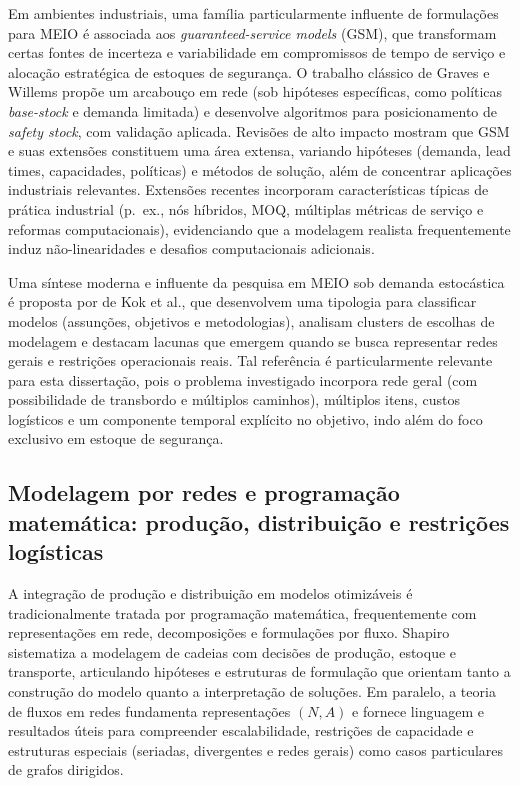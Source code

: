 Em ambientes industriais, uma família particularmente influente de formulações para MEIO é associada aos \emph{guaranteed-service models} (GSM), que transformam certas fontes de incerteza e variabilidade em compromissos de tempo de serviço e alocação estratégica de estoques de segurança. O trabalho clássico de Graves e Willems propõe um arcabouço em rede (sob hipóteses específicas, como políticas \emph{base-stock} e demanda limitada) e desenvolve algoritmos para posicionamento de \emph{safety stock}, com validação aplicada. \cite{GravesWillems2000SafetyStock} Revisões de alto impacto mostram que GSM e suas extensões constituem uma área extensa, variando hipóteses (demanda, lead times, capacidades, políticas) e métodos de solução, além de concentrar aplicações industriais relevantes. \cite{Eruguz2016GSMsurvey} Extensões recentes incorporam características típicas de prática industrial (p.\ ex., nós híbridos, MOQ, múltiplas métricas de serviço e reformas computacionais), evidenciando que a modelagem realista frequentemente induz não-linearidades e desafios computacionais adicionais. \cite{Achkar2024GSMExtensions}

Uma síntese moderna e influente da pesquisa em MEIO sob demanda estocástica é proposta por de Kok et al., que desenvolvem uma tipologia para classificar modelos (assunções, objetivos e metodologias), analisam clusters de escolhas de modelagem e destacam lacunas que emergem quando se busca representar redes gerais e restrições operacionais reais. \cite{DeKok2018Typology} Tal referência é particularmente relevante para esta dissertação, pois o problema investigado incorpora rede geral (com possibilidade de transbordo e múltiplos caminhos), múltiplos itens, custos logísticos e um componente temporal explícito no objetivo, indo além do foco exclusivo em estoque de segurança.


\subsection{Modelagem por redes e programação matemática: produção, distribuição e restrições logísticas}

A integração de produção e distribuição em modelos otimizáveis é tradicionalmente tratada por programação matemática, frequentemente com representações em rede, decomposições e formulações por fluxo. Shapiro sistematiza a modelagem de cadeias com decisões de produção, estoque e transporte, articulando hipóteses e estruturas de formulação que orientam tanto a construção do modelo quanto a interpretação de soluções. \cite{Shapiro2001ModelingSupplyChain} Em paralelo, a teoria de fluxos em redes fundamenta representações \( (N,A) \) e fornece linguagem e resultados úteis para compreender escalabilidade, restrições de capacidade e estruturas especiais (seriadas, divergentes e redes gerais) como casos particulares de grafos dirigidos. \cite{AhujaMagnantiOrlin1993NetworkFlows}

